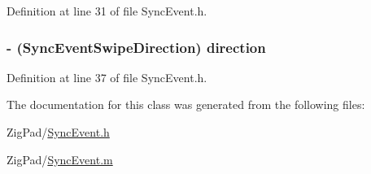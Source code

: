 Definition at line 31 of file SyncEvent.h.

\hypertarget{interface_sync_event_af2e9a1b1dcae54a6d29d4ab3ea82ac36}{
\subsubsection[{direction}]{\setlength{\rightskip}{0pt plus 5cm}-\/ ({\bf SyncEventSwipeDirection}) direction}}
\label{interface_sync_event_af2e9a1b1dcae54a6d29d4ab3ea82ac36}


Definition at line 37 of file SyncEvent.h.



The documentation for this class was generated from the following files:\begin{DoxyCompactItemize}
\item 
ZigPad/\hyperlink{_sync_event_8h}{SyncEvent.h}\item 
ZigPad/\hyperlink{_sync_event_8m}{SyncEvent.m}\end{DoxyCompactItemize}
